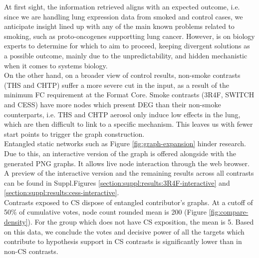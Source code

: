 At first sight, the information retrieved aligns with an expected outcome, i.e. since we are handling lung expression data from smoked and control cases, we anticipate insight lined up with any of the main known problems related to smoking, such as proto-oncogenes supportting lung cancer. However, is on biology experts to determine for which to aim to proceed, keeping divergent solutions as a possible outcome, mainly due to the unpredictability, and hidden mechanistic when it comes to systems biology.
\\

On the other hand, on a broader view of control results, non-smoke contrasts (THS and  CHTP) suffer a more severe cut in the input, as a result of the minimum FC requirement at the Format Core. Smoke contrasts (3R4F, SWITCH and CESS) have more nodes which present DEG than their non-smoke counterparts, i.e. THS and CHTP aerosol only induce low effects in the lung, which are then difficult to link to a specific mechanism. This leaves us with fewer start points to trigger the graph construction.
\\

Entangled static networks such as Figure \ref{fig:graph-expansion} hinder research. Due to this, an interactive version of the graph is offered alongside with the generated PNG graphs. It allows live node interaction through the web browser. A preview of the interactive version and the remaining results across all contrasts can be found in Suppl.Figures \ref{section:suppl:results:3R4F-interactive} and \ref{section:suppl:results:cess-interactive}.
\\

Contrasts exposed to CS dispose of entangled contributor’s graphs. At a cutoff of 50\% of cumulative votes, node count rounded mean is 200 (Figure \ref{fig:compare-density}). For the group which does not have CS exposition, the mean is 5. Based on this data, we conclude the votes and decisive power of all the targets which contribute to hypothesis support in CS contrasts is significantly lower than in non-CS contrasts.
\\

